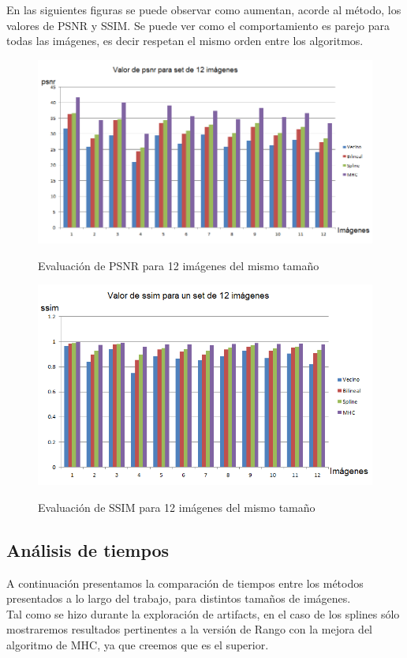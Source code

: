 \documentclass[a4paper]{article}
\begin{document}
\newpage
En las siguientes figuras se puede observar como aumentan, acorde al m\'etodo, los valores de PSNR y SSIM. Se puede ver como el comportamiento es parejo para todas las im\'agenes, es decir respetan el mismo orden entre los algoritmos.
\begin{figure}[h!]
    \caption{Evaluaci\'on de PSNR para 12 im\'agenes del mismo tama\~no}
    \begin{center}
    \includegraphics[scale=0.75]{imagenes/graficos/psnr}
    \label{psnr}
  \end{center}
\end{figure}

\begin{figure}[h!]
    \caption{Evaluaci\'on de SSIM para 12 im\'agenes del mismo tama\~no}
    \begin{center}
    \includegraphics[scale=0.75]{imagenes/graficos/ssim}
    \label{ssim}
  \end{center}
\end{figure}

\newpage
\subsection{An\'alisis de tiempos}
A continuación presentamos la comparación de tiempos entre los métodos presentados a lo largo del trabajo, para distintos tamaños de imágenes.\\
Tal como se hizo durante la exploración de artifacts, en el caso de los splines sólo mostraremos resultados pertinentes a la versión de Rango con la mejora del algoritmo de MHC, ya que creemos que es el superior.\\
\end{document}
